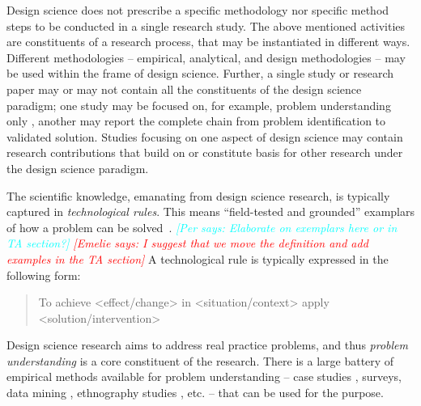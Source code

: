 \documentclass[graybox]{svmult}
\newcommand{\emelie}[1]{\textcolor{red}{{\it [Emelie says: #1]}}}
\newcommand{\per}[1]{\textcolor{cyan}{{\it [Per says: #1]}}}
\newcommand{\emelie}[1]{}
\newcommand{\per}[1]{}
\begin{document}
Design science does not prescribe a specific methodology nor specific method steps to be conducted in a single research study. The above mentioned activities are constituents of  a research process, that may be instantiated in different ways. Different methodologies -- empirical, analytical, and  design methodologies -- may be used within the frame of design science. Further, a single study or research paper may or may not contain all the constituents of the design science paradigm; one study may be focused on, for example,  problem understanding only%
, another may report the complete chain from problem identification to validated solution. Studies focusing on one aspect of design science may contain research contributions that build on or constitute basis for other research under the design science paradigm.

The scientific knowledge, emanating from design science research, is typically captured in \emph{technological rules}. This means ``field-tested and grounded'' examplars of how a problem can be solved~\cite{van_aken_management_2004}. \per{Elaborate on exemplars here or in TA section?} \emelie{I suggest that we move the definition and add examples in the TA section} A technological rule is typically expressed in the following form: 

\begin{quote}{To achieve <effect/change> in <situation/context> apply <solution/intervention>}\end{quote}



Design science research aims to address real practice problems, and thus \emph{problem understanding} is a core constituent of the research. There is a large battery of empirical methods available for problem understanding -- case studies \cite{Runeson12Case}, surveys, data mining \cite{MenziesDataMining2016}, ethnography studies \cite{SharpEthnography2016}, etc. -- that can be used for the purpose.
\end{document}
